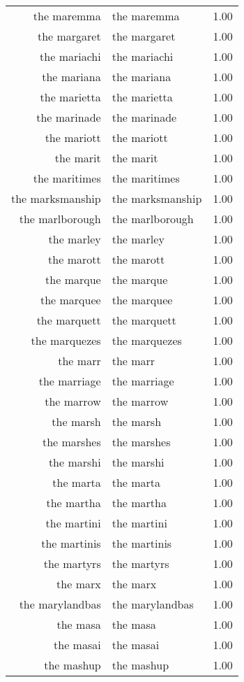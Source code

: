 \begin{table}[ht]
\begin{tabular}{rlr}
  the maremma & the maremma & 1.00 \\ 
  the margaret & the margaret & 1.00 \\ 
  the mariachi & the mariachi & 1.00 \\ 
  the mariana & the mariana & 1.00 \\ 
  the marietta & the marietta & 1.00 \\ 
  the marinade & the marinade & 1.00 \\ 
  the mariott & the mariott & 1.00 \\ 
  the marit & the marit & 1.00 \\ 
  the maritimes & the maritimes & 1.00 \\ 
  the marksmanship & the marksmanship & 1.00 \\ 
  the marlborough & the marlborough & 1.00 \\ 
  the marley & the marley & 1.00 \\ 
  the marott & the marott & 1.00 \\ 
  the marque & the marque & 1.00 \\ 
  the marquee & the marquee & 1.00 \\ 
  the marquett & the marquett & 1.00 \\ 
  the marquezes & the marquezes & 1.00 \\ 
  the marr & the marr & 1.00 \\ 
  the marriage & the marriage & 1.00 \\ 
  the marrow & the marrow & 1.00 \\ 
  the marsh & the marsh & 1.00 \\ 
  the marshes & the marshes & 1.00 \\ 
  the marshi & the marshi & 1.00 \\ 
  the marta & the marta & 1.00 \\ 
  the martha & the martha & 1.00 \\ 
  the martini & the martini & 1.00 \\ 
  the martinis & the martinis & 1.00 \\ 
  the martyrs & the martyrs & 1.00 \\ 
  the marx & the marx & 1.00 \\ 
  the marylandbas & the marylandbas & 1.00 \\ 
  the masa & the masa & 1.00 \\ 
  the masai & the masai & 1.00 \\ 
  the mashup & the mashup & 1.00 \\ 

\end{tabular}
\end{table}
